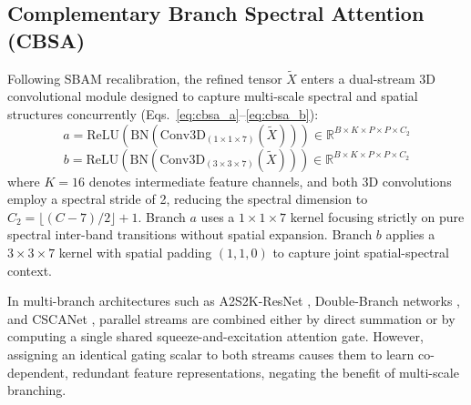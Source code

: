 \documentclass[manuscript,screen,review]{acmart}
\begin{document}
\subsection{Complementary Branch Spectral Attention (CBSA)}
\label{subsec:cbsa}
Following SBAM recalibration, the refined tensor $\tilde{X}$ enters a dual-stream 3D convolutional module designed to capture multi-scale spectral and spatial structures concurrently (Eqs.~\ref{eq:cbsa_a}--\ref{eq:cbsa_b}):
\begin{equation}
\label{eq:cbsa_a}
a = \text{ReLU}\left(\text{BN}\left(\text{Conv3D}_{(1 \times 1 \times 7)}(\tilde{X})\right)\right) \in \mathbb{R}^{B \times K \times P \times P \times C_2}
\end{equation}
\begin{equation}
\label{eq:cbsa_b}
b = \text{ReLU}\left(\text{BN}\left(\text{Conv3D}_{(3 \times 3 \times 7)}(\tilde{X})\right)\right) \in \mathbb{R}^{B \times K \times P \times P \times C_2}
\end{equation}
where $K = 16$ denotes intermediate feature channels, and both 3D convolutions employ a spectral stride of 2, reducing the spectral dimension to $C_2 = \lfloor (C - 7) / 2 \rfloor + 1$. Branch $a$ uses a $1 \times 1 \times 7$ kernel focusing strictly on pure spectral inter-band transitions without spatial expansion. Branch $b$ applies a $3 \times 3 \times 7$ kernel with spatial padding $(1, 1, 0)$ to capture joint spatial-spectral context.

In multi-branch architectures such as A2S2K-ResNet \cite{roy2020attention}, Double-Branch networks \cite{li2020double}, and CSCANet \cite{wang2023cscanet}, parallel streams are combined either by direct summation or by computing a single shared squeeze-and-excitation attention gate. However, assigning an identical gating scalar to both streams causes them to learn co-dependent, redundant feature representations, negating the benefit of multi-scale branching.
\end{document}
